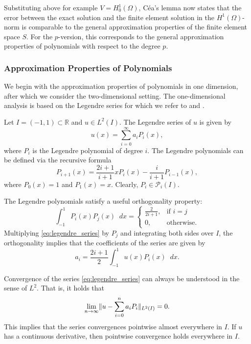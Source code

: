 \documentclass[english, 12pt, a4paper, sci, utf8, a-2b, online]{aaltothesis}
\theoremstyle{definition}
\theoremstyle{plain}
\DeclarePairedDelimiter\norm{\lVert}{\rVert}
\newcommand*\diff{\mathop{}\!d}
\numberwithin{equation}{section}
\begin{document}
Substituting above for example $V = H_0^1(\Omega)$,
Céa's lemma now states that the error between the exact solution
and the finite element solution in the $H^1(\Omega)$-norm
is comparable to the general approximation properties of
the finite element space $S$. For the $p$-version,
this corresponds to the general approximation properties of polynomials
with respect to the degree $p$.

\subsubsection{Approximation Properties of Polynomials}
\label{subsubsec:approximation_properties_of_polynomials}

We begin with the approximation properties of polynomials in one dimension,
after which we consider the two-dimensional setting.
The one-dimensional analysis is based on the Legendre series
for which we refer to \cite{schwab1998} and \cite{andrews1998}.

Let $I = (-1,1) \subset \mathbb{R}$ and $u \in L^2(I)$.
The Legendre series of $u$ is given by
\begin{equation}
    \label{eq:legendre_series}
    u(x) = \sum_{i=0}^{\infty} a_i P_i(x),
\end{equation}
where $P_i$ is the Legendre polynomial of degree $i$.
The Legendre polynomials can be defined via the recursive formula
\begin{equation*}
    P_{i+1}(x) = \frac{2i+1}{i+1} x P_i(x) - \frac{i}{i+1} P_{i-1}(x),
\end{equation*}
where $P_0(x)=1$ and $P_1(x)=x$. Clearly, $P_i \in \mathcal{P}_i(I)$.

The Legendre polynomials satisfy a useful orthogonality property:
\begin{equation*}
    \int_{-1}^{1} P_i(x) P_j(x) \diff x =
    \begin{cases}
        \frac{2}{2i+1}, & \text{if } i = j \\
        0, & \text{otherwise}.
    \end{cases}
\end{equation*}
Multiplying \eqref{eq:legendre_series} by $P_j$ and integrating
both sides over $I$, the orthogonality implies that
the coefficients of the series are given by
\begin{equation*}
    a_i = \frac{2i+1}{2} \int_{-1}^{1} u(x) P_i(x) \diff x.
\end{equation*}

Convergence of the series \eqref{eq:legendre_series} can always be understood
in the sense of $L^2$. That is, it holds that
\begin{equation*}
    \lim_{n \to \infty} \norm{u - \sum_{i=0}^{n} a_i P_i}_{L^2(I)} = 0.
\end{equation*}
This implies that the series convergences pointwise
almost everywhere in $I$. If $u$ has a continuous derivative,
then pointwise convergence holds everywhere in $I$.
\end{document}
